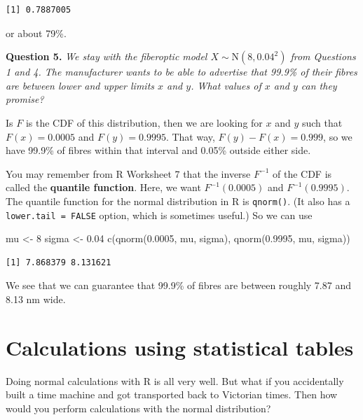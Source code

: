 \documentclass[
  a4paper,
]{book}
\newenvironment{Shaded}{\begin{snugshade}}{\end{snugshade}}
\newcommand{\DecValTok}[1]{\textcolor[rgb]{0.00,0.00,0.81}{#1}}
\newcommand{\FloatTok}[1]{\textcolor[rgb]{0.00,0.00,0.81}{#1}}
\newcommand{\FunctionTok}[1]{\textcolor[rgb]{0.00,0.00,0.00}{#1}}
\newcommand{\NormalTok}[1]{#1}
\newcommand{\OtherTok}[1]{\textcolor[rgb]{0.56,0.35,0.01}{#1}}
\theoremstyle{definition}
\theoremstyle{definition}
\theoremstyle{definition}
\theoremstyle{definition}
\theoremstyle{remark}
\begin{document}
\begin{verbatim}
[1] 0.7887005
\end{verbatim}

or about 79\%.

\textbf{Question 5.} \emph{We stay with the fiberoptic model \(X \sim \mathrm{N}(8, 0.04^2)\) from Questions 1 and 4. The manufacturer wants to be able to advertise that 99.9\% of their fibres are between lower and upper limits \(x\) and \(y\). What values of \(x\) and \(y\) can they promise?}

Is \(F\) is the CDF of this distribution, then we are looking for \(x\) and \(y\) such that \(F(x) = 0.0005\) and \(F(y) = 0.9995\). That way, \(F(y) - F(x) = 0.999\), so we have 99.9\% of fibres within that interval and 0.05\% outside either side.

You may remember from R Worksheet 7 that the inverse \(F^{-1}\) of the CDF is called the \textbf{quantile function}. Here, we want \(F^{-1}(0.0005)\) and \(F^{-1}(0.9995)\). The quantile function for the normal distribution in R is \texttt{qnorm()}. (It also has a \texttt{lower.tail\ =\ FALSE} option, which is sometimes useful.) So we can use

\begin{Shaded}
\begin{Highlighting}[]
\NormalTok{mu }\OtherTok{\textless{}{-}} \DecValTok{8}
\NormalTok{sigma }\OtherTok{\textless{}{-}} \FloatTok{0.04}
\FunctionTok{c}\NormalTok{(}\FunctionTok{qnorm}\NormalTok{(}\FloatTok{0.0005}\NormalTok{, mu, sigma), }\FunctionTok{qnorm}\NormalTok{(}\FloatTok{0.9995}\NormalTok{, mu, sigma))}
\end{Highlighting}
\end{Shaded}

\begin{verbatim}
[1] 7.868379 8.131621
\end{verbatim}

We see that we can guarantee that 99.9\% of fibres are between roughly 7.87 and 8.13 nm wide.

\hypertarget{normal-tables}{%
\section{Calculations using statistical tables}\label{normal-tables}}

Doing normal calculations with R is all very well. But what if you accidentally built a time machine and got transported back to Victorian times. Then how would you perform calculations with the normal distribution?
\end{document}
